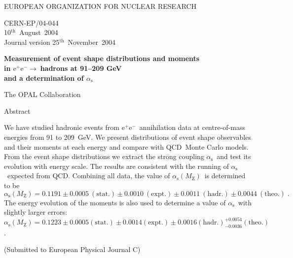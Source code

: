 \documentclass[12pt,a4paper,twoside]{article}
\newcommand{\epem}   {\ensuremath{\mathrm{e^+e^-}}}
\newcommand{\as}     {\ensuremath{\alpha_{\mathrm{s}}}}
\newcommand{\asmz}   {\ensuremath{\alpha_{\mathrm{s}}(\mz)}}
\newcommand{\mz}     {\ensuremath{M_{\mathrm{Z}}}}
\newcommand{\bm}[1]  {\mbox{\boldmath\ensuremath{#1}}}
\newcommand{\qcd}{\mbox{QCD}}
\begin{document}

%
\begin{titlepage}
\begin{center}{\large   EUROPEAN ORGANIZATION FOR NUCLEAR RESEARCH
}\end{center}\bigskip
\begin{flushright}
       CERN-EP/04-044   \\ 10$^{\mathrm{th}}$~August~2004
\\ Journal version 25$^{\mathrm{th}}$~November~2004
\end{flushright}
\bigskip\bigskip\bigskip\bigskip\bigskip
%
\begin{center}
{\huge\bf
Measurement of event shape distributions 
and moments \\ in \bm{\epem\rightarrow\;}hadrons  
at 91--209 GeV \\\vspace{3mm} and a determination of \bm{\as}
}
\end{center}
\bigskip\bigskip
\begin{center}
{\LARGE The OPAL Collaboration}
\end{center}
\bigskip\bigskip\bigskip
\begin{center}{\large  Abstract}\end{center}
We have studied hadronic events from \epem\ annihilation data at
centre-of-mass energies from 91 to 209~GeV. 
We present distributions of event shape observables 
and their moments
at each energy and compare with \qcd\ Monte Carlo models.
From the event shape distributions we extract the
strong coupling \as\ and test its evolution with energy scale.
The results are consistent with the running of \as\
expected from \qcd.
Combining all data, the value of \asmz\ is determined to be
\[ \asmz =  0.1191
\pm0.0005~\mathrm{(stat.)}
\pm0.0010~\mathrm{(expt.)}
\pm0.0011~\mathrm{(hadr.)}
\pm0.0044~\mathrm{(theo.)}\;. \]
The energy evolution of the moments is also used to determine 
a value of \as\ with slightly larger errors:
$\asmz=0.1223\pm 0.0005(\mathrm{stat.})\pm 0.0014(\mathrm{expt.})\pm 0.0016(\mathrm{hadr.}) ^{+0.0054}_{-0.0036}(\mathrm{theo.})$.

\bigskip\bigskip
%
\bigskip
\begin{center}
{\large 
(Submitted to European Physical Journal C) }
\end{center}
 

\end{titlepage}
\end{document}

